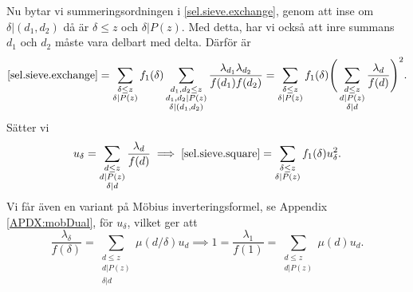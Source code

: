 Nu bytar vi summeringsordningen i \eqref{sel.sieve.exchange}, genom att inse om \(\delta|(d_1,d_2)\) då är \(\delta \leq z\) och \(\delta | P(z)\).
Med detta, har vi också att inre summans \(d_1\) och \(d_2\) måste vara delbart med delta. Därför är
\begin{equation}
    \eqref{sel.sieve.exchange} = \sum_{\substack{\delta \leq z\\ \delta | P(z)}}f_1(\delta) \sum_{\substack{d_1,d_2\leq z\\d_1,d_2|P(z)\\\delta|(d_1,d_2)}}\frac{\lambda_{d_1}\lambda_{d_2}}{f(d_1)f(d_2)} = \sum_{\substack{\delta \leq z\\ \delta | P(z)}}f_1(\delta)\Bigg(\sum_{\substack{d\leq z\\d|P(z)\\\delta|d}}\frac{\lambda_d}{f(d)}\Bigg)^2.\label{sel.sieve.square}
\end{equation}
Sätter vi 
\begin{equation}
u_\delta = \sum_{\substack{d\leq z \\ d|P(z) \\ \delta | d}} \frac{\lambda_d}{f(d)} \implies \eqref{sel.sieve.square} = \sum_{\substack{\delta \leq z\\ \delta | P(z)}}f_1(\delta) u_\delta^2\label{sel.sieve.uuu}.
\end{equation}
Vi får även en variant på Möbius inverteringsformel, se Appendix \ref{APDX:mobDual}, för \(u_\delta\), vilket ger att
\begin{equation}
    \frac{\lambda_\delta}{f(\delta)} = \sum_{\substack{d\leq z\\d|P(z)\\\delta|d}} \mu(d/\delta)u_d \implies 1 = \frac{\lambda_1}{f(1)} = \sum_{\substack{d\leq z\\ d|P(z)}}\mu(d)u_d.\label{sel.sieve.one}
\end{equation}

